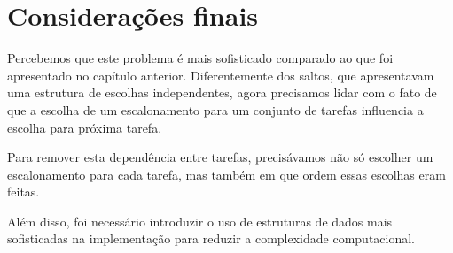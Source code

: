 \section{Considerações finais}

Percebemos que este problema é mais sofisticado comparado ao que foi apresentado no capítulo anterior. Diferentemente dos saltos, que apresentavam uma estrutura de escolhas independentes, agora precisamos lidar com o fato de que a escolha de um escalonamento para um conjunto de tarefas influencia a escolha para próxima tarefa.

Para remover esta dependência entre tarefas, precisávamos não só escolher um escalonamento para cada tarefa, mas também em que ordem essas escolhas eram feitas.

Além disso, foi necessário introduzir o uso de estruturas de dados mais sofisticadas na implementação para reduzir a complexidade computacional.